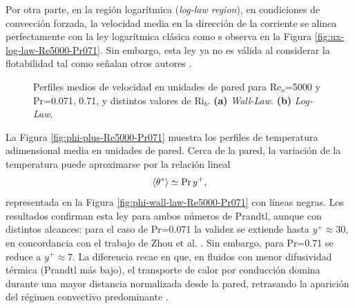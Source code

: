 Por otra parte, en la región logarítmica (\textit{log-law region}), en condiciones de convección forzada, la velocidad media en la dirección de la corriente se alinea perfectamente con la ley logarítmica clásica \cite{kawamura2000dns} como s observa en la Figura \ref{fig:ux-log-law-Re5000-Pr071}. Sin embargo, esta ley ya no es válida al considerar la flotabilidad tal como señalan otros autores \cite{zhou2024direct}. 

\begin{figure}[H]
  \centering
    \caption{Perfiles medios de velocidad en unidades de pared para Re$_o$=5000 y Pr=0.071, 0.71, y distintos valores de Ri$_b$. \textbf{(a)} \textit{Wall-Law}. \textbf{(b)} \textit{Log-Law}. }
    \label{fig:ux-plus-Re5000-Pr071}
\end{figure}

La Figura \ref{fig:phi-plus-Re5000-Pr071} muestra los perfiles de temperatura adimensional media en unidades de pared. Cerca de la pared, la variación de la temperatura puede aproximarse por la relación lineal \cite{kawamura1998dns}
\begin{equation*}
\langle \theta^* \rangle \simeq \text{Pr}\hspace{0.5mm} y^+ ,
\end{equation*}
representada en la Figura \ref{fig:phi-wall-law-Re5000-Pr071} con líneas negras. Los resultados confirman esta ley para ambos números de Prandtl, aunque con distintos alcances: para el caso de Pr=0.071 la validez se extiende hasta $y^{+}\approx 30$, en concordancia con el trabajo de Zhou et al. \cite{zhou2024direct}. Sin embargo, para Pr=0.71 se reduce a $y^{+}\approx 7$. La diferencia recae en que, en fluidos con menor difusividad térmica (Prandtl más bajo), el transporte de calor por conducción domina durante una mayor distancia normalizada desde la pared, retrasando la aparición del régimen convectivo predominante \cite{abregu2023dns}.

